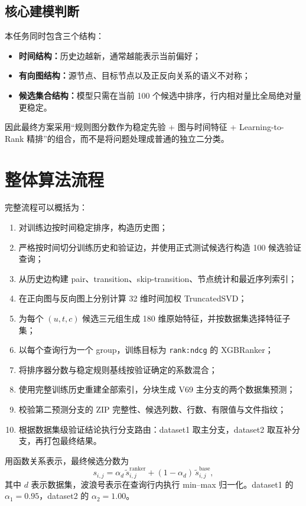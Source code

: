 \documentclass[UTF8,a4paper,11pt]{ctexart}
\begin{document}
\subsection{核心建模判断}

本任务同时包含三个结构：

\begin{itemize}
  \item \textbf{时间结构：}历史边越新，通常越能表示当前偏好；
  \item \textbf{有向图结构：}源节点、目标节点以及正反向关系的语义不对称；
  \item \textbf{候选集合结构：}模型只需在当前 100 个候选中排序，行内相对量比全局绝对量更稳定。
\end{itemize}

因此最终方案采用“规则图分数作为稳定先验 + 图与时间特征 + Learning-to-Rank 精排”的组合，而不是将问题处理成普通的独立二分类。

\section{整体算法流程}

完整流程可以概括为：

\begin{enumerate}
  \item 对训练边按时间稳定排序，构造历史图；
  \item 严格按时间切分训练历史和验证边，并使用正式测试候选行构造 100 候选验证查询；
  \item 从历史边构建 pair、transition、skip-transition、节点统计和最近序列索引；
  \item 在正向图与反向图上分别计算 32 维时间加权 TruncatedSVD；
  \item 为每个 $(u,t,c)$ 候选三元组生成 180 维原始特征，并按数据集选择特征子集；
  \item 以每个查询行为一个 group，训练目标为 \texttt{rank:ndcg} 的 XGBRanker；
  \item 将排序器分数与稳定规则基线按验证确定的系数混合；
  \item 使用完整训练历史重建全部索引，分块生成 V69 主分支的两个数据集预测；
  \item 校验第二预测分支的 ZIP 完整性、候选列数、行数、有限值与文件指纹；
  \item 根据数据集级验证结论执行分支路由：dataset1 取主分支，dataset2 取互补分支，再打包最终结果。
\end{enumerate}

用函数关系表示，最终候选分数为
\[
s_{i,j}=\alpha_d\,\widetilde{s}^{\text{ranker}}_{i,j}
+(1-\alpha_d)\,\widetilde{s}^{\text{base}}_{i,j},
\]
其中 $d$ 表示数据集，波浪号表示在查询行内执行 min--max 归一化。dataset1 的 $\alpha_1=0.95$，dataset2 的 $\alpha_2=1.00$。
\end{document}
